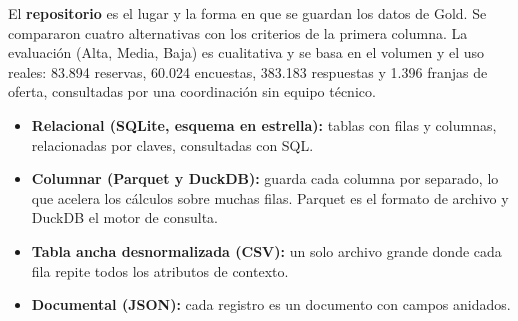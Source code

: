 \documentclass[11pt,letterpaper]{article}
\begin{document}
El \textbf{repositorio} es el lugar y la forma en que se guardan los datos de Gold. Se compararon cuatro alternativas con los criterios de la primera columna. La evaluación (Alta, Media, Baja) es cualitativa y se basa en el volumen y el uso reales: 83.894 reservas, 60.024 encuestas, 383.183 respuestas y 1.396 franjas de oferta, consultadas por una coordinación sin equipo técnico.

\begin{itemize}[leftmargin=1.5em,itemsep=2pt]
\item \textbf{Relacional (SQLite, esquema en estrella):} tablas con filas y columnas, relacionadas por claves, consultadas con SQL.
\item \textbf{Columnar (Parquet y DuckDB):} guarda cada columna por separado, lo que acelera los cálculos sobre muchas filas. Parquet es el formato de archivo y DuckDB el motor de consulta.
\item \textbf{Tabla ancha desnormalizada (CSV):} un solo archivo grande donde cada fila repite todos los atributos de contexto.
\item \textbf{Documental (JSON):} cada registro es un documento con campos anidados.
\end{itemize}
\end{document}
